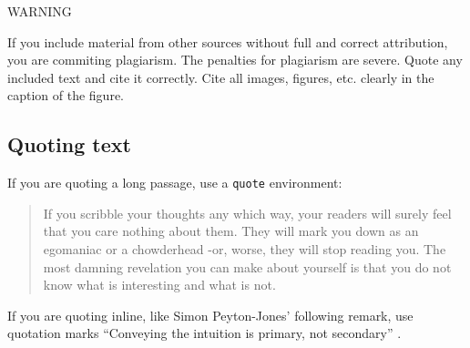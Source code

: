 \begin{highlight_title}{WARNING}
    
    If you include material from other sources without full and correct attribution, you are commiting plagiarism. The penalties for plagiarism are severe.
    Quote any included text and cite it correctly. Cite all images, figures, etc. clearly in the caption of the figure.
\end{highlight_title}

\subsection{Quoting text}

If you are quoting a long passage, use a \texttt{quote} environment:

\begin{quote}
     If you scribble your thoughts any which way, your readers will surely feel that you care nothing about them. They will mark you down as an egomaniac or a chowderhead -or, worse, they will stop reading you. The most damning revelation you can make about yourself is that you do not know what is interesting and what is not.
\end{quote} \citep{Von80}

If you are quoting inline, like Simon Peyton-Jones' following remark, use quotation marks ``Conveying the intuition is primary, not
secondary'' \citep{Pey17}.
